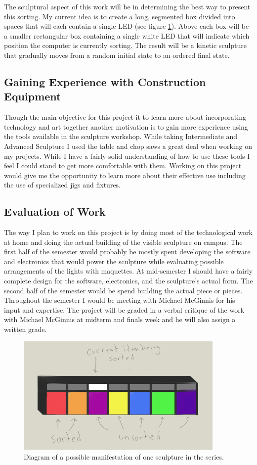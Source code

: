 \documentclass[12pt,a4paper]{article}
\begin{document}
The sculptural aspect of this work will be in determining the best way to
present this sorting.  My current idea is to create a long, segmented box
divided into spaces that will each contain a single LED (see figure
\ref{fig:diagram}).  Above each box will be a smaller rectangular box containing
a single white LED that will indicate which position the computer is currently
sorting.  The result will be a kinetic sculpture that gradually moves from a
random initial state to an ordered final state.

\subsection*{Gaining Experience with Construction Equipment}

Though the main objective for this project it to learn more about incorporating
technology and art together another motivation is to gain more experience using
the tools available in the sculpture workshop.  While taking Intermediate and
Advanced Sculpture I used the table and chop saws a great deal when working on
my projects.  While I have a fairly solid understanding of how to use these
tools I feel I could stand to get more comfortable with them.  Working on this
project would give me the opportunity to learn more about their effective use
including the use of specialized jigs and fixtures.

\subsection*{Evaluation of Work}

The way I plan to work on this project is by doing most of the technological
work at home and doing the actual building of the visible sculpture on campus.
The first half of the semester would probably be mostly spent developing the
software and electronics that would power the sculpture while evaluating
possible arrangements of the lights with maquettes.  At mid-semester I should
have a fairly complete design for the software, electronics, and the sculpture's
actual form.  The second half of the semester would be spend building the actual
piece or pieces.  Throughout the semester I would be meeting with Michael
McGinnis for his input and expertise.  The project will be graded in a verbal
critique of the work with Michael McGinnis at midterm and finals week and he
will also assign a written grade.



\pagebreak
\begin{figure}[here]
    \includegraphics[width=0.9\textwidth]{images/diagram.png}
    \caption{Diagram of a possible manifestation of one sculpture in the series.}
    \label{fig:diagram}
\end{figure}
\end{document}
